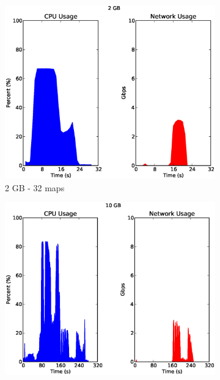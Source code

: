 \documentclass[a4paper,12pt,twoside,openright]{report}
\begin{document}
\begin{figure}[h!]
        \begin{subfigure}[b]{0.33\textwidth}
                \centering
                \includegraphics[width=\textwidth]{32maps_dctcp.csv.eps}
                \caption{2 GB - 32 maps}
                \label{fig:2GBsortresdctcp}
        \end{subfigure}%
        \begin{subfigure}[b]{0.33\textwidth}
                \centering
                \includegraphics[width=\textwidth]{160maps_dctcp.csv.eps}

\end{subfigure}
\end{figure}
\end{document}
